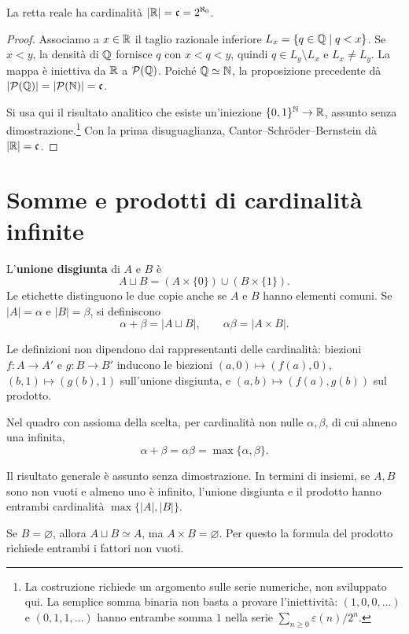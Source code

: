 \begin{teorema}\label{teo:continuo}
La retta reale ha cardinalità $|\mathbb{R}|=\mathfrak c=2^{\aleph_0}$.
\end{teorema}
\begin{proof}
 Associamo a $x\in\mathbb{R}$ il taglio razionale inferiore $L_x=\{q\in\mathbb{Q}\mid q<x\}$. Se $x<y$, la densità di $\mathbb{Q}$ fornisce $q$ con $x<q<y$, quindi $q\in L_y\setminus L_x$ e $L_x\ne L_y$. La mappa è iniettiva da $\mathbb{R}$ a $\mathcal P(\mathbb{Q})$. Poiché $\mathbb{Q}\simeq\mathbb{N}$, la proposizione precedente dà $|\mathcal P(\mathbb{Q})|=|\mathcal P(\mathbb{N})|=\mathfrak c$.

 Si usa qui il risultato analitico che esiste un'iniezione $\{0,1\}^{\mathbb{N}}\to\mathbb{R}$, assunto senza dimostrazione.\footnote{La costruzione richiede un argomento sulle serie numeriche, non sviluppato qui. La semplice somma binaria non basta a provare l'iniettività: $(1,0,0,\ldots)$ e $(0,1,1,\ldots)$ hanno entrambe somma $1$ nella serie $\sum_{n\ge0}\varepsilon(n)/2^n$.} Con la prima disuguaglianza, Cantor--Schröder--Bernstein dà $|\mathbb{R}|=\mathfrak c$.
\end{proof}


\section{Somme e prodotti di cardinalità infinite}
\begin{definizione}
L'\textbf{unione disgiunta} di $A$ e $B$ è
\[
A\sqcup B=(A\times\{0\})\cup(B\times\{1\}).
\]
Le etichette distinguono le due copie anche se $A$ e $B$ hanno elementi comuni. Se $|A|=\alpha$ e $|B|=\beta$, si definiscono
\[
\alpha+\beta=|A\sqcup B|,\qquad \alpha\beta=|A\times B|.
\]
\end{definizione}
Le definizioni non dipendono dai rappresentanti delle cardinalità: biezioni $f:A\to A'$ e $g:B\to B'$ inducono le biezioni $(a,0)\mapsto(f(a),0)$, $(b,1)\mapsto(g(b),1)$ sull'unione disgiunta, e $(a,b)\mapsto(f(a),g(b))$ sul prodotto.

\begin{teorema}
Nel quadro con assioma della scelta, per cardinalità non nulle $\alpha,\beta$, di cui almeno una infinita,
\[
\alpha+\beta=\alpha\beta=\max\{\alpha,\beta\}.
\]
\end{teorema}
Il risultato generale è assunto senza dimostrazione. In termini di insiemi, se $A,B$ sono non vuoti e almeno uno è infinito, l'unione disgiunta e il prodotto hanno entrambi cardinalità $\max\{|A|,|B|\}$.

\begin{osservazione}
Se $B=\varnothing$, allora $A\sqcup B\simeq A$, ma $A\times B=\varnothing$. Per questo la formula del prodotto richiede entrambi i fattori non vuoti.
\end{osservazione}
